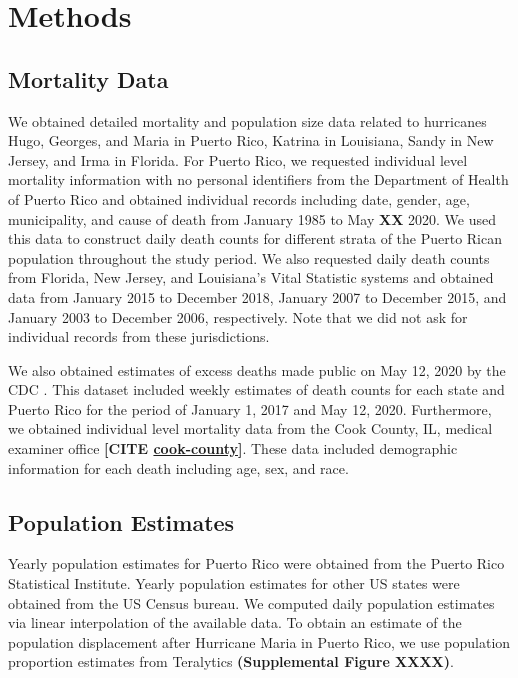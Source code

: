\documentclass[11pt]{article}
\begin{document}
\section{Methods}
\label{sec:methods}

\subsection{Mortality Data}
\label{subsec:mortality-data}
We obtained detailed mortality and population size data related to hurricanes Hugo, Georges, and Maria in Puerto Rico, Katrina in Louisiana, Sandy in New Jersey, and Irma in Florida. For Puerto Rico, we requested individual level mortality information with no personal identifiers from the Department of Health of Puerto Rico and obtained individual records including date, gender, age, municipality, and cause of death from January 1985 to May \textbf{XX} 2020. We used this data to construct daily death counts for different strata of the Puerto Rican population throughout the study period. We also requested daily death counts from Florida, New Jersey, and Louisiana’s Vital Statistic systems and obtained data from January 2015 to December 2018, January 2007 to December 2015, and January 2003 to December 2006, respectively. Note that we did not ask for individual records from these jurisdictions.

We also obtained estimates of excess deaths made public on May 12, 2020 by the CDC \cite{cdc2020covid19}. This dataset included weekly estimates of death counts for each state and Puerto Rico for the period of January 1, 2017 and May 12, 2020. Furthermore, we obtained individual level mortality data from the Cook County, IL, medical examiner office \textbf{[CITE \href{https://www.cookcountyil.gov/agency/medical-examiner}{cook-county}]}. These data included demographic information for each death including age, sex, and race.

\subsection{Population Estimates}
\label{subsec:population}
Yearly population estimates for Puerto Rico were obtained from the Puerto Rico Statistical Institute. Yearly population estimates for other US states were obtained from the US Census bureau. We computed daily population estimates via linear interpolation of the available data. To obtain an estimate of the population displacement after Hurricane Maria in Puerto Rico, we use population proportion estimates from Teralytics \textbf{(Supplemental Figure XXXX)}.
\end{document}
